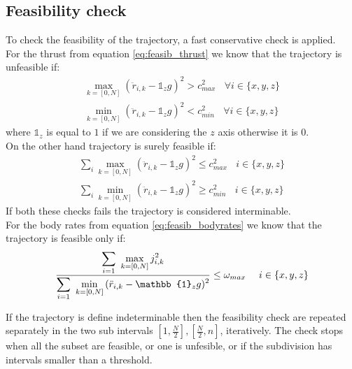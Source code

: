\subsection{Feasibility check} \label{feasibility_check}
To check the feasibility of the trajectory, a fast conservative check is applied.\\
For the thrust from equation \ref{eq:feasib_thrust} we know that the trajectory is unfeasible if:
\begin{align}
\max_{k=[0,N]} {(\ddot{r}_{i,k}- \mathbb{1}_zg)^2} > c_{max}^2 \ \ \ \ \forall i\in\{x,y,z\} \\
\min_{k=[0,N]} {(\ddot{r}_{i,k} - \mathbb{1}_zg)^2} < c_{min}^2 \ \ \ \ \forall i\in\{x,y,z\}
\end{align}
where $\mathbb{1}_z$ is equal to $1$ if we are considering the $z$ axis otherwise it is $0$.\\
On the other hand trajectory is surely feasible if:
\begin{align}
\sum_i{\max_{k=[0,N]} {(\ddot{r}_{i,k}- \mathbb{1}_zg)^2}} \leq c_{max}^2 \ \ \ \ i\in\{x,y,z\}\\
\sum_i{\min_{k=[0,N]} {(\ddot{r}_{i,k} - \mathbb{1}_zg)^2}} \geq c_{min}^2 \ \ \ \  i\in\{x,y,z\}
\label{eq:thrust_minmax}
\end{align}
If both these checks fails the trajectory is considered interminable.\\
For the body rates from equation \ref{eq:feasib_bodyrates} we know that the trajectory is feasible only if:
\begin{align}
\ddfrac{\sum\limits_{i=1} \  \max\limits_{k=[0,N]} j_{i,k}^2 }{\sum\limits_{i=1} \ {\min\limits_{k=[0,N]} {(\ddot{r}_{i,k} - \mathbb{1}_zg)^2}}} \leq \omega_{max} \ \ \ \ i\in\{x,y,z\}
\label{eq:body_rates_max}
\end{align}

If the trajectory is define indeterminable then the feasibility check are repeated separately in the two sub intervals $[1,\frac{N}{2}], [\frac{N}{2},n]$, iteratively. The check stops when all the subset are feasible, or one is unfesible, or if the subdivision has intervals smaller than a threshold.


